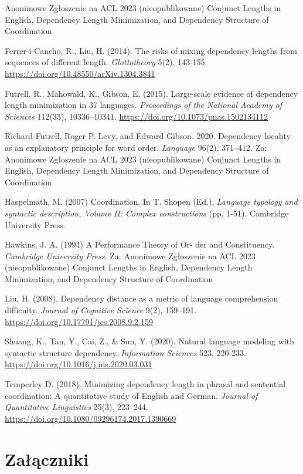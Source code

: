\documentclass[licencjacka]{pracamgr_Kogni}
\begin{document}
\begin{thebibliography}{99}

Anonimowe Zgłoszenie na ACL 2023 (nieopublikowane) Conjunct Lengths in English, Dependency Length Minimization, and Dependency Structure of Coordination

Ferrer-i-Cancho, R., Liu, H. (2014). The risks of mixing dependency lengths from sequences of different length. \textit{Glottotheory} 5(2), 143-155. \url{https://doi.org/10.48550/arXiv.1304.3841}

Futrell, R., Mahowald, K., Gibson, E. (2015). Large-scale evidence of dependency length minimization in 37 languages. \textit{Proceedings of the National Academy of Sciences} 112(33), 10336–10341. \url{https://doi.org/10.1073/pnas.1502134112}

Richard Futrell, Roger P. Levy, and Edward Gibson. 2020. Dependency locality as an explanatory principle for word order. \textit{Language} 96(2), 371–412. Za: Anonimowe Zgłoszenie na ACL 2023 (nieopublikowane) Conjunct Lengths in English, Dependency Length Minimization, and Dependency Structure of Coordination

Haspelmath, M. (2007) Coordination. In T. Shopen (Ed.), \textit{Language typology and syntactic description, Volume II: Complex constructions} (pp. 1-51). Cambridge University Press.

Hawkins, J. A. (1994) A Performance Theory of Or- der and Constituency. \textit{Cambridge University Press}. Za: Anonimowe Zgłoszenie na ACL 2023 (nieopublikowane) Conjunct Lengths in English, Dependency Length Minimization, and Dependency Structure of Coordination

Liu, H. (2008). Dependency distance as a metric of language comprehension difficulty. \textit{Journal of Cognitive Science} 9(2), 159–191. \url{https://doi.org/10.17791/jcs.2008.9.2.159}

Shuang, K., Tan, Y., Cai, Z., \& Sun, Y. (2020). Natural language modeling with syntactic structure dependency. \textit{Information Sciences} 523, 220-233. \url{https://doi.org/10.1016/j.ins.2020.03.031}

Temperley D. (2018). Minimizing dependency length in phrasal and sentential coordination: A quantitative study of English and German. \textit{Journal of Quantitative Linguistics} 25(3), 223–244. \url{https://doi.org/10.1080/09296174.2017.1390669}

\end{thebibliography}


\chapter*{Załączniki}
\end{document}
